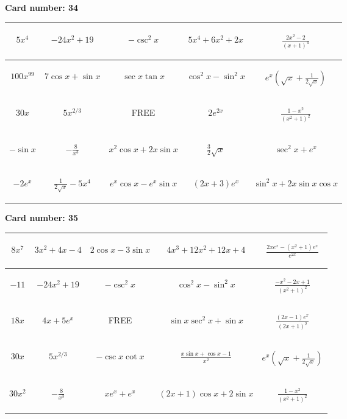 \documentclass{article}
\newcommand{\entry}[1]{\begin{minipage}[t][2.75cm][t]{4cm} \vspace{1cm} \begin{center}#1\end{center} \end{minipage}}
\newcommand{\freespace}{\entry{FREE}}
\newcommand{\cardnumber}[1]{\noindent \textbf{Card number: #1} \bigskip}
\begin{document}
\pagebreak

\cardnumber{34}
\begin{center}
\begin{tabular}{|*{5}{c|}}
    \hline
    \entry{$5x^4$} & \entry{$-24x^2 + 19$} & \entry{$-\csc^2 x$} & \entry{$5x^4 + 6x^2 + 2x$} & \entry{$\frac{2x^2 - 2}{(x + 1)^4}$} \\ \hline
    \entry{$100x^{99}$} & \entry{$7 \cos x + \sin x$} & \entry{$\sec x \tan x$} & \entry{$\cos^2 x - \sin^2 x$} & \entry{$e^x \left(\sqrt{x} + \frac{1}{2\sqrt{x}}\right)$} \\ \hline
    \entry{$30x$} & \entry{$5x^{2/3}$} & \freespace & \entry{$2e^{2x}$} & \entry{$\frac{1 - x^2}{(x^2 + 1)^2}$} \\ \hline
    \entry{$-\sin x$} & \entry{$-\frac{8}{x^3}$} & \entry{$x^2 \cos x + 2x \sin x$} & \entry{$\frac{3}{2} \sqrt{x}$} & \entry{$\sec^2 x + e^x$} \\ \hline
    \entry{$-2e^x$} & \entry{$\frac{1}{2\sqrt{x}} - 5x^4$} & \entry{$e^x \cos x - e^x \sin x$} & \entry{$(2x + 3) e^x$} & \entry{$\sin^2 x + 2x \sin x \cos x$} \\ \hline
\end{tabular}
\end{center}

\pagebreak

\cardnumber{35}
\begin{center}
\begin{tabular}{|*{5}{c|}}
    \hline
    \entry{$8x^7$} & \entry{$3x^2 + 4x - 4$} & \entry{$2 \cos x - 3 \sin x$} & \entry{$4x^3 + 12x^2 + 12x + 4$} & \entry{$\frac{2x e^x - (x^2 + 1) e^x}{e^{2x}}$} \\ \hline
    \entry{$-11$} & \entry{$-24x^2 + 19$} & \entry{$-\csc^2 x$} & \entry{$\cos^2 x - \sin^2 x$} & \entry{$\frac{-x^2 - 2x + 1}{(x^2 + 1)^2}$} \\ \hline
    \entry{$18x$} & \entry{$4x + 5e^x$} & \freespace & \entry{$\sin x \sec^2 x + \sin x$} & \entry{$\frac{(2x - 1) e^x}{(2x + 1)^2}$} \\ \hline
    \entry{$30x$} & \entry{$5x^{2/3}$} & \entry{$-\csc x \cot x$} & \entry{$\frac{x \sin x + \cos x - 1}{x^2}$} & \entry{$e^x \left(\sqrt{x} + \frac{1}{2\sqrt{x}}\right)$} \\ \hline
    \entry{$30x^2$} & \entry{$-\frac{8}{x^3}$} & \entry{$x e^x + e^x$} & \entry{$(2x + 1) \cos x + 2 \sin x$} & \entry{$\frac{1 - x^2}{(x^2 + 1)^2}$} \\ \hline
\end{tabular}
\end{center}
\end{document}
